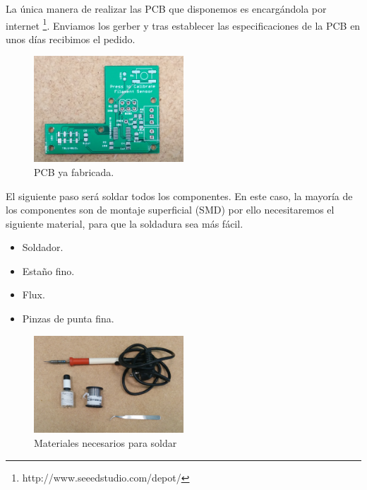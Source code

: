 La única manera de realizar las PCB que disponemos es encargándola por internet \footnote{http://www.seeedstudio.com/depot/}. Enviamos los gerber y tras establecer las especificaciones de la PCB en unos días recibimos el pedido.\\
   \begin{figure}[H]
            \centering
            \includegraphics[width=0.5\textwidth]{images/sensor/IMG_20150414_105219_.jpg}
            \caption{PCB ya fabricada.}
            \label{fig:sens_pcb}
    \end{figure}

El siguiente paso será soldar todos los componentes. En este caso, la mayoría de los componentes son de montaje superficial (SMD) por ello necesitaremos el siguiente material, para que la soldadura sea más fácil.

	\begin{itemize}
		\item{Soldador.}
		\item{Estaño fino.}
		\item{Flux.}
		\item{Pinzas de punta fina.}
	\end{itemize}
   \begin{figure}[H]
            \centering
            \includegraphics[width=0.5\textwidth]{images/sensor/IMG_20150417_160216.jpg}
            \caption{Materiales necesarios para soldar}
            \label{fig:sens_materiales}
    \end{figure}

